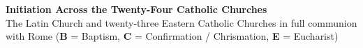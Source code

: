 \providecommand{\churchesInitiationTitle}{Initiation Across the Twenty-Four Catholic Churches}
\providecommand{\churchesInitiationPageHook}{}
\providecommand{\churchesInitiationEndHook}{}

\begin{landscape}
\hypersetup{pdfview=Fit}
\churchesInitiationPageHook
{}
\thispagestyle{plain}
\begin{center}
  {\Large\bfseries \churchesInitiationTitle}\\[-0.10em]
  {\scriptsize The Latin Church and twenty-three Eastern Catholic Churches  in full communion with Rome (\textbf{B} = Baptism, \textbf{C} = Confirmation / Chrismation, \textbf{E} = Eucharist)}
\end{center}
\vspace{-0.70em}


\end{landscape}
